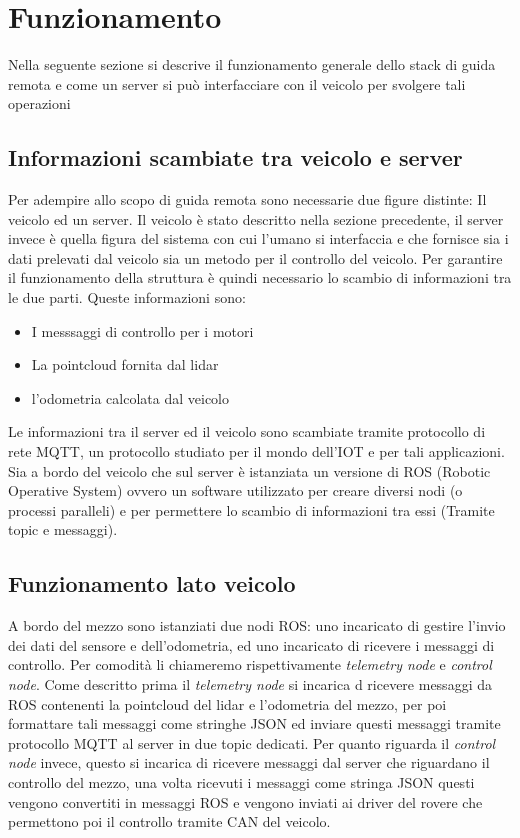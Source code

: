 \section{Funzionamento}
Nella seguente sezione si descrive il funzionamento generale dello stack di guida remota e come un server si può interfacciare con il veicolo per svolgere tali operazioni
\subsection{Informazioni scambiate tra veicolo e server}
Per adempire allo scopo di guida remota sono necessarie due figure distinte: Il veicolo ed un server. Il veicolo è stato descritto nella sezione precedente, il server invece è quella figura del sistema con cui l'umano si interfaccia e che fornisce sia i dati prelevati dal veicolo sia un metodo per il controllo del veicolo.
Per garantire il funzionamento della struttura è quindi necessario lo scambio di informazioni tra le due parti. Queste informazioni sono:

\begin{itemize}
  \item I messsaggi di controllo per i motori
  \item La pointcloud fornita dal lidar
  \item l'odometria calcolata dal veicolo
\end{itemize}

Le informazioni tra il server ed il veicolo sono scambiate tramite protocollo di rete MQTT, un protocollo studiato per il mondo dell'IOT e per tali applicazioni.
Sia a bordo del veicolo che sul server è istanziata un versione di ROS (Robotic Operative System) ovvero un software utilizzato per creare diversi nodi (o processi paralleli) e per permettere lo scambio di informazioni tra essi (Tramite topic e messaggi).
\subsection{Funzionamento lato veicolo}
A bordo del mezzo sono istanziati due nodi ROS: uno incaricato di gestire l'invio dei dati del sensore e dell'odometria, ed uno incaricato di ricevere i messaggi di controllo. Per comodità li chiameremo rispettivamente \textit{telemetry node} e \textit{control node}. 
Come descritto prima il \textit{telemetry node} si incarica d ricevere messaggi da ROS contenenti la pointcloud del lidar e l'odometria del mezzo, per poi formattare tali messaggi come stringhe JSON ed inviare questi messaggi tramite protocollo MQTT al server in due topic dedicati.
Per quanto riguarda il \textit{control node} invece, questo si incarica di ricevere messaggi dal server che riguardano il controllo del mezzo, una volta ricevuti i messaggi come stringa JSON questi vengono convertiti in messaggi ROS e vengono inviati ai driver del rovere che permettono poi il controllo tramite CAN del veicolo.
